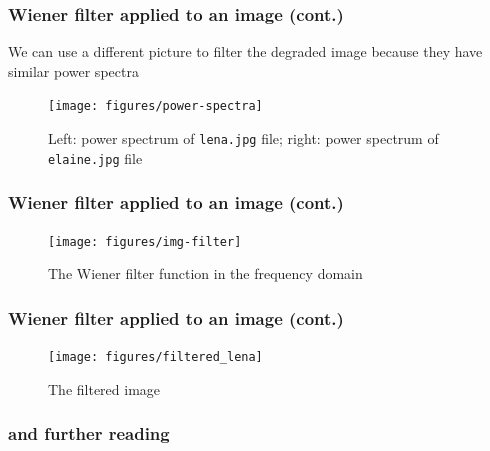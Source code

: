 \documentclass[10pt]{beamer}
\begin{document}
\begin{frame}
  \frametitle{Wiener filter applied to an image (cont.)}
  We can use a different picture to filter the degraded image because they have
  similar power spectra
  \begin{figure}
    \centering
    \texttt{[image: figures/power-spectra]}
    \caption{Left: power spectrum of \texttt{lena.jpg} file; right: power
      spectrum of \texttt{elaine.jpg} file}
  \end{figure}
\end{frame}

\begin{frame}
  \frametitle{Wiener filter applied to an image (cont.)}
  \begin{figure}
    \centering
    \vspace{-0.5em}
    \texttt{[image: figures/img-filter]}
    \caption{The Wiener filter function in the frequency domain}
    \vspace{-1em}
  \end{figure}
\end{frame}

\begin{frame}
  \frametitle{Wiener filter applied to an image (cont.)}
  \begin{figure}
    \centering
    \vspace{-0.5em}
    \texttt{[image: figures/filtered\_lena]}
    \caption{The filtered image}
    \vspace{-1em}
  \end{figure}
\end{frame}

\begin{frame}
  \frametitle{\refname{} and further reading}
  \nocite{*}
  \printbibliography{}
\end{frame}
\end{document}
